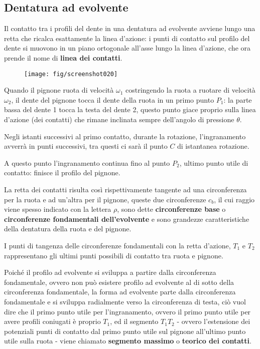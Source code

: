 \documentclass[a4paper, 15pt]{article}
\begin{document}
\subsection{Dentatura ad evolvente}
\begin{adjustwidth}{2in}{}
	 Il contatto tra i profili del dente in una dentatura ad evolvente avviene lungo una retta che ricalca esattamente la linea d'azione: i punti di contatto sul profilo del dente si muovono in un piano ortogonale all'asse lungo la linea d'azione, che ora prende il nome di \textbf{linea dei contatti}.
	 \begin{figure}[H]
	 	\centering
	 	\texttt{[image: fig/screenshot020]}
	 	\label{fig:screenshot020}
	 \end{figure}	 
	 Quando il pignone ruota di velocità $\omega_1$ costringendo la ruota a ruotare di velocità $\omega_2$, il dente del pignone tocca il dente della ruota in un primo punto $P_1$: la parte bassa del dente 1 tocca la testa del dente 2, questo punto giace proprio sulla linea d'azione (dei contatti) che rimane inclinata sempre dell'angolo di pressione $\theta$.
	 
	 Negli istanti successivi al primo contatto, durante la rotazione, l'ingranamento avverrà in punti successivi, tra questi ci sarà il punto $C$ di istantanea rotazione. 
	 
	 A questo punto l'ingranamento continua fino al punto $P_2$, ultimo punto utile di contatto: finisce il profilo del pignone. \newline 
	 
	 La retta dei contatti risulta così rispettivamente tangente ad una circonferenza per la ruota e ad un'altra per il pignone, queste due circonferenze $c_b$, il cui raggio viene spesso indicato con la lettera $\rho$, sono dette \textbf{circonferenze base} o \textbf{circonferenze fondamentali dell'evolvente} e sono grandezze caratteristiche della dentatura della ruota e del pignone.
	 
	 I punti di tangenza delle circonferenze fondamentali con la retta d'azione, $T_1$ e $T_2$ rappresentano gli ultimi punti possibili di contatto tra ruota e pignone.\newline
	 
	 Poiché il profilo ad evolvente si sviluppa a partire dalla circonferenza fondamentale, ovvero non può esistere profilo ad evolvente al di sotto della circonferenza fondamentale, la forma ad evolvente parte dalla circonferenza fondamentale e si sviluppa radialmente verso la circonferenza di testa, ciò vuol dire che il primo punto utile per l'ingranamento, ovvero il primo punto utile per avere profili coniugati è proprio $T_1$, ed il segmento $T_1T_2$ - ovvero l'estensione dei potenziali punti di contatto dal primo punto utile sul pignone all'ultimo punto utile sulla ruota - viene chiamato \textbf{segmento massimo}  o \textbf{teorico dei contatti}. \newline
	 

\end{adjustwidth}
\end{document}
